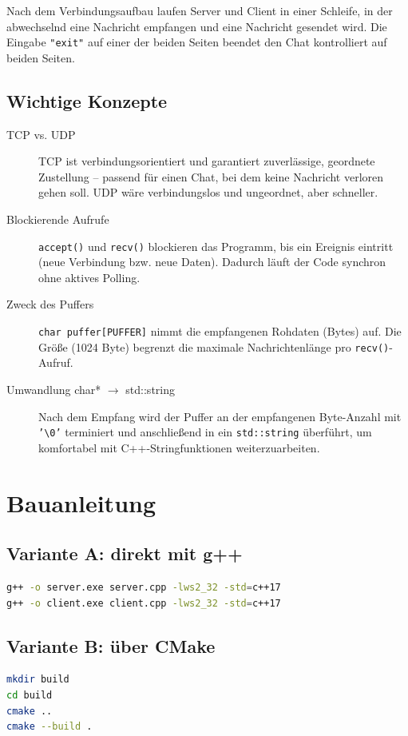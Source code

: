 \documentclass[a4paper,11pt]{article}
\begin{document}
Nach dem Verbindungsaufbau laufen Server und Client in einer Schleife, in
der abwechselnd eine Nachricht empfangen und eine Nachricht gesendet wird.
Die Eingabe \texttt{"exit"} auf einer der beiden Seiten beendet den Chat
kontrolliert auf beiden Seiten.

\subsection{Wichtige Konzepte}

\begin{description}
    \item[TCP vs. UDP] TCP ist verbindungsorientiert und garantiert
    zuverlässige, geordnete Zustellung -- passend für einen Chat, bei dem
    keine Nachricht verloren gehen soll. UDP wäre verbindungslos und
    ungeordnet, aber schneller.
    \item[Blockierende Aufrufe] \texttt{accept()} und \texttt{recv()}
    blockieren das Programm, bis ein Ereignis eintritt (neue Verbindung
    bzw. neue Daten). Dadurch läuft der Code synchron ohne aktives Polling.
    \item[Zweck des Puffers] \texttt{char puffer[PUFFER]} nimmt die
    empfangenen Rohdaten (Bytes) auf. Die Größe (1024 Byte) begrenzt die
    maximale Nachrichtenlänge pro \texttt{recv()}-Aufruf.
    \item[Umwandlung char* $\rightarrow$ std::string] Nach dem Empfang wird
    der Puffer an der empfangenen Byte-Anzahl mit \texttt{'\textbackslash 0'}
    terminiert und anschließend in ein \texttt{std::string} überführt, um
    komfortabel mit C++-Stringfunktionen weiterzuarbeiten.
\end{description}

\section{Bauanleitung}

\subsection{Variante A: direkt mit g++}
\begin{lstlisting}[style=cmakestyle,language=bash,numbers=none]
g++ -o server.exe server.cpp -lws2_32 -std=c++17
g++ -o client.exe client.cpp -lws2_32 -std=c++17
\end{lstlisting}

\subsection{Variante B: über CMake}
\begin{lstlisting}[style=cmakestyle,language=bash,numbers=none]
mkdir build
cd build
cmake ..
cmake --build .
\end{lstlisting}
\end{document}
